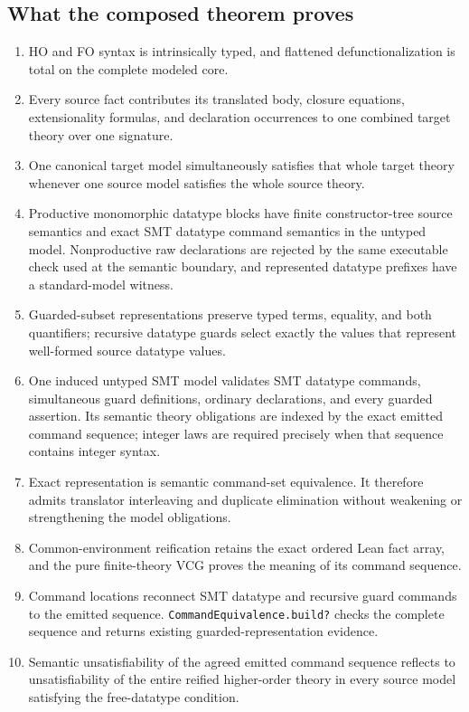 \documentclass[11pt]{article}
\theoremstyle{remark}
\begin{document}
\subsection{What the composed theorem proves}

\begin{enumerate}[leftmargin=*]
 \item HO and FO syntax is intrinsically typed, and flattened
       defunctionalization is total on the complete modeled core.
 \item Every source fact contributes its translated body, closure equations,
       extensionality formulas, and declaration occurrences to one combined
       target theory over one signature.
 \item One canonical target model simultaneously satisfies that whole target
       theory whenever one source model satisfies the whole source theory.
 \item Productive monomorphic datatype blocks have finite constructor-tree source
       semantics and exact SMT datatype command semantics in the untyped model.
       Nonproductive raw declarations are rejected by the same executable check
       used at the semantic boundary, and represented datatype prefixes have a
       standard-model witness.
 \item Guarded-subset representations preserve typed terms, equality, and both
       quantifiers; recursive datatype guards select exactly the values that
       represent well-formed source datatype values.
 \item One induced untyped SMT model validates SMT datatype commands, simultaneous
       guard definitions, ordinary declarations, and every guarded assertion.
       Its semantic theory obligations are indexed by the exact emitted command
       sequence; integer laws are required precisely when that sequence contains
       integer syntax.
 \item Exact representation is semantic command-set equivalence. It therefore
       admits translator interleaving and duplicate elimination without
       weakening or strengthening the model obligations.
 \item Common-environment reification retains the exact ordered Lean fact array,
       and the pure finite-theory VCG proves the meaning of its command sequence.
 \item Command locations reconnect SMT datatype and recursive guard commands
       to the emitted sequence. \texttt{CommandEquivalence.build?}
       checks the complete sequence and returns existing guarded-representation evidence.
 \item Semantic unsatisfiability of the agreed emitted command sequence reflects to
       unsatisfiability of the entire reified higher-order theory in every
       source model satisfying the free-datatype condition.
\end{enumerate}
\end{document}
